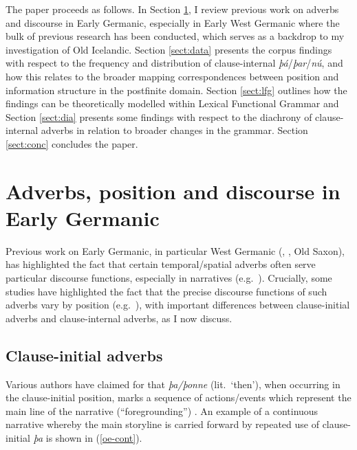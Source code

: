 \documentclass[output=paper,colorlinks,citecolor=brown]{langscibook}
\begin{document}
The paper proceeds as follows. In Section \ref{sect:emgc}, I review previous work on adverbs and discourse in Early Germanic, especially in Early West Germanic where the bulk of previous research has been conducted, which serves as a backdrop to my investigation of Old Icelandic. Section \ref{sect:data} presents the corpus findings with respect to the frequency and distribution of clause-internal \textit{þá}/\textit{þar}/\textit{nú}, and how this relates to the broader mapping correspondences between position and information structure in the postfinite domain. Section \ref{sect:lfg} outlines how the findings can be theoretically modelled within Lexical Functional Grammar and Section \ref{sect:dia} presents some findings with respect to the diachrony of clause-internal adverbs in relation to broader changes in the grammar. Section \ref{sect:conc} concludes the paper.

\section{Adverbs, position and discourse in Early Germanic}\label{sect:emgc}

Previous work on Early Germanic, in particular West Germanic (, , Old Saxon), has highlighted the fact that certain temporal/spatial adverbs often serve particular discourse functions, especially in narratives (e.g.~\citealp{foster1975use,enkvist1986more,enkvist1987old,vanKem-Los2006,trips2009syntax,waarvik2013participant,Cichosz2022}). Crucially, some studies have highlighted the fact that the precise discourse functions of such adverbs vary by position (e.g.~\citealp{vanKem-Los2006,Axel2007,donhauser2009rolle,vanKem2011syntax,petrova2011modeling,vanKem2020discourse,catasso2021he}), with important differences between clause-initial adverbs and clause-internal adverbs, as I now discuss.


\subsection{Clause-initial adverbs}
Various authors have claimed for  that \textit{þa/þonne} (lit.~`then'), when occurring in the clause-initial position, marks a sequence of actions/events which represent the main line of the narrative (``foregrounding'') \citep{foster1975use,enkvist1986more,enkvist1987old,waarvik2013participant,Cichosz2022}. 
An example of a continuous narrative whereby the main storyline is carried forward by repeated use of clause-initial \textit{þa} is shown in (\ref{oe-cont}).
\end{document}
